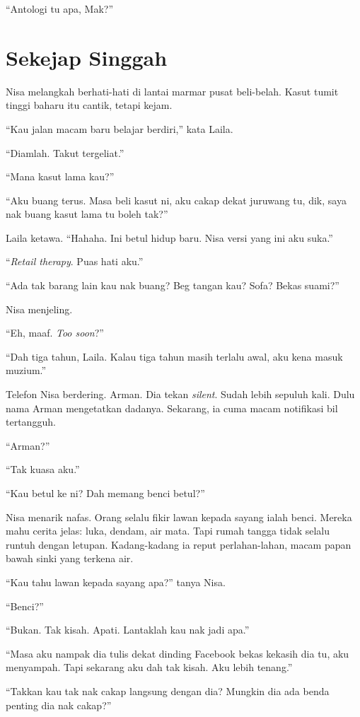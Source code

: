 \documentclass[
  11pt,
  a5paper,
  openany,
  oneside]{book}
\begin{document}
``Antologi tu apa, Mak?''

\chapter{Sekejap Singgah}\label{sekejap-singgah}

Nisa melangkah berhati-hati di lantai marmar pusat beli-belah. Kasut
tumit tinggi baharu itu cantik, tetapi kejam.

``Kau jalan macam baru belajar berdiri,'' kata Laila.

``Diamlah. Takut tergeliat.''

``Mana kasut lama kau?''

``Aku buang terus. Masa beli kasut ni, aku cakap dekat juruwang tu, dik,
saya nak buang kasut lama tu boleh tak?''

Laila ketawa. ``Hahaha. Ini betul hidup baru. Nisa versi yang ini aku
suka.''

``\emph{Retail therapy}. Puas hati aku.''

``Ada tak barang lain kau nak buang? Beg tangan kau? Sofa? Bekas
suami?''

Nisa menjeling.

``Eh, maaf. \emph{Too soon}?''

``Dah tiga tahun, Laila. Kalau tiga tahun masih terlalu awal, aku kena
masuk muzium.''

Telefon Nisa berdering. Arman. Dia tekan \emph{silent}. Sudah lebih
sepuluh kali. Dulu nama Arman mengetatkan dadanya. Sekarang, ia cuma
macam notifikasi bil tertangguh.

``Arman?''

``Tak kuasa aku.''

``Kau betul ke ni? Dah memang benci betul?''

Nisa menarik nafas. Orang selalu fikir lawan kepada sayang ialah benci.
Mereka mahu cerita jelas: luka, dendam, air mata. Tapi rumah tangga
tidak selalu runtuh dengan letupan. Kadang-kadang ia reput
perlahan-lahan, macam papan bawah sinki yang terkena air.

``Kau tahu lawan kepada sayang apa?'' tanya Nisa.

``Benci?''

``Bukan. Tak kisah. Apati. Lantaklah kau nak jadi apa.''

``Masa aku nampak dia tulis dekat dinding Facebook bekas kekasih dia tu,
aku menyampah. Tapi sekarang aku dah tak kisah. Aku lebih tenang.''

``Takkan kau tak nak cakap langsung dengan dia? Mungkin dia ada benda
penting dia nak cakap?''
\end{document}
